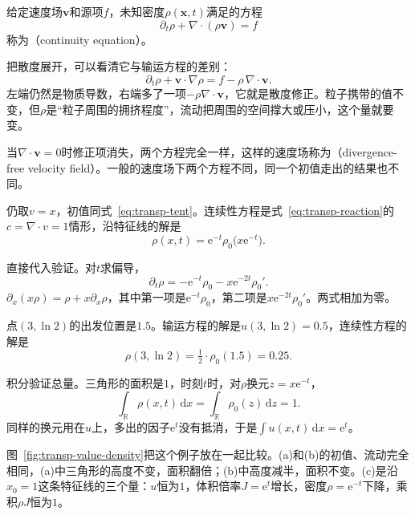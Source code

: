 \begin{definition}[连续性方程]
\label{def:transp-continuity}
给定速度场$\bm{v}$和源项$f$，未知密度$\rho(\bm{x},t)$满足的方程
\begin{equation}
  \partial_t\rho+\nabla\cdot(\rho\bm{v})=f
  \label{eq:transp-continuity}
\end{equation}
称为（continuity equation）。
\end{definition}

把散度展开，可以看清它与输运方程的差别：
\begin{equation}
  \partial_t\rho+\bm{v}\cdot\nabla\rho=f-\rho\,\nabla\cdot\bm{v}.
  \label{eq:transp-divergence-correction}
\end{equation}
左端仍然是物质导数，右端多了一项$-\rho\nabla\cdot\bm{v}$，它就是散度修正。粒子携带的值不变，但$\rho$是“粒子周围的拥挤程度”，流动把周围的空间撑大或压小，这个量就要变。

当$\nabla\cdot\bm{v}=0$时修正项消失，两个方程完全一样，这样的速度场称为（divergence-free velocity field）。一般的速度场下两个方程不同，同一个初值走出的结果也不同。

\begin{example}[同一流动下的值与密度]
\label{ex:transp-rho-stretch}
仍取$v=x$，初值同式~\eqref{eq:transp-tent}。连续性方程是式~\eqref{eq:transp-reaction}的$c=\nabla\cdot v=1$情形，沿特征线的解是
\[
  \rho(x,t)=\mathrm{e}^{-t}\rho_0\bigl(x\mathrm{e}^{-t}\bigr).
\]

直接代入验证。对$t$求偏导，
\[
  \partial_t\rho=-\mathrm{e}^{-t}\rho_0-x\mathrm{e}^{-2t}\rho_0'.
\]
$\partial_x(x\rho)=\rho+x\partial_x\rho$，其中第一项是$\mathrm{e}^{-t}\rho_0$，第二项是$x\mathrm{e}^{-2t}\rho_0'$。两式相加为零。

点$(3,\ln2)$的出发位置是$1.5$。输运方程的解是$u(3,\ln2)=0.5$，连续性方程的解是
\[
  \rho(3,\ln2)=\tfrac12\cdot\rho_0(1.5)=0.25.
\]

积分验证总量。三角形的面积是$1$，时刻$t$时，对$\rho$换元$z=x\mathrm{e}^{-t}$，
\[
  \int_{\mathbb{R}}\rho(x,t)\,\mathrm{d}x=\int_{\mathbb{R}}\rho_0(z)\,\mathrm{d}z=1.
\]
同样的换元用在$u$上，多出的因子$\mathrm{e}^{t}$没有抵消，于是$\int u(x,t)\,\mathrm{d}x=\mathrm{e}^{t}$。
\end{example}

图~\ref{fig:transp-value-density}把这个例子放在一起比较。(a)和(b)的初值、流动完全相同，(a)中三角形的高度不变，面积翻倍；(b)中高度减半，面积不变。(c)是沿$x_0=1$这条特征线的三个量：$u$恒为$1$，体积倍率$J=\mathrm{e}^{t}$增长，密度$\rho=\mathrm{e}^{-t}$下降，乘积$\rho J$恒为$1$。

